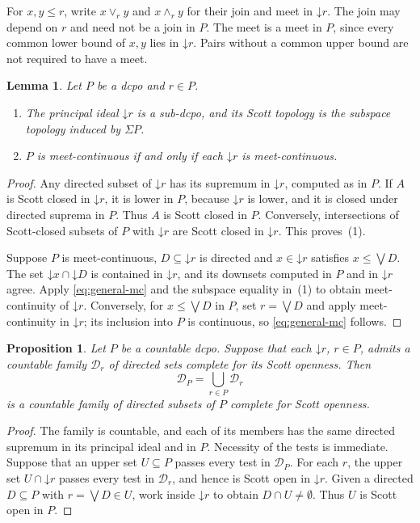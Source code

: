 \documentclass[11pt,reqno]{amsart}
\newtheorem{lemma}[theorem]{Lemma}
\newtheorem{proposition}[theorem]{Proposition}
\theoremstyle{definition}
\theoremstyle{remark}
\numberwithin{equation}{section}
\newcommand{\down}[1]{\mathord{\downarrow}#1}
\newcommand{\Sig}{\Sigma}
\newcommand{\mc}{\wedge}
\newcommand{\jc}{\vee}
\begin{document}
For $x,y\le r$, write $x\jc_r y$ and $x\mc_r y$ for their join and meet in $\down r$. The join may depend on $r$ and need not be a join in $P$. The meet is a meet in $P$, since every common lower bound of $x,y$ lies in $\down r$. Pairs without a common upper bound are not required to have a meet.

\begin{lemma}\label{lem:principal-localization}
Let $P$ be a dcpo and $r\in P$.
\begin{enumerate}[label=\textup{(\arabic*)}]
\item The principal ideal $\down r$ is a sub-dcpo, and its Scott topology is the subspace topology induced by $\Sig P$.
\item $P$ is meet-continuous if and only if each $\down r$ is meet-continuous.
\end{enumerate}
\end{lemma}
\begin{proof}
Any directed subset of $\down r$ has its supremum in $\down r$, computed as in $P$. If $A$ is Scott closed in $\down r$, it is lower in $P$, because $\down r$ is lower, and it is closed under directed suprema in $P$. Thus $A$ is Scott closed in $P$. Conversely, intersections of Scott-closed subsets of $P$ with $\down r$ are Scott closed in $\down r$. This proves~(1).

Suppose $P$ is meet-continuous, $D\subseteq \down r$ is directed and $x\in \down r$ satisfies $x\le\bigvee D$. The set $\down x\cap\down D$ is contained in $\down r$, and its downsets computed in $P$ and in $\down r$ agree. Apply \eqref{eq:general-mc} and the subspace equality in~(1) to obtain meet-continuity of $\down r$. Conversely, for $x\le\bigvee D$ in $P$, set $r=\bigvee D$ and apply meet-continuity in $\down r$; its inclusion into $P$ is continuous, so \eqref{eq:general-mc} follows.
\end{proof}

\begin{proposition}\label{prop:local-tests}
Let $P$ be a countable dcpo. Suppose that each $\down r$, $r\in P$, admits a countable family $\mathcal D_r$ of directed sets complete for its Scott openness. Then
\begin{equation}\label{eq:local-test-union}
 \mathcal D_P=\bigcup_{r\in P}\mathcal D_r
\end{equation}
is a countable family of directed subsets of $P$ complete for Scott openness.
\end{proposition}
\begin{proof}
The family is countable, and each of its members has the same directed supremum in its principal ideal and in $P$. Necessity of the tests is immediate. Suppose that an upper set $U\subseteq P$ passes every test in $\mathcal D_P$. For each $r$, the upper set $U\cap\down r$ passes every test in $\mathcal D_r$, and hence is Scott open in $\down r$. Given a directed $D\subseteq P$ with $r=\bigvee D\in U$, work inside $\down r$ to obtain $D\cap U\ne\emptyset$. Thus $U$ is Scott open in $P$.
\end{proof}
\end{document}
